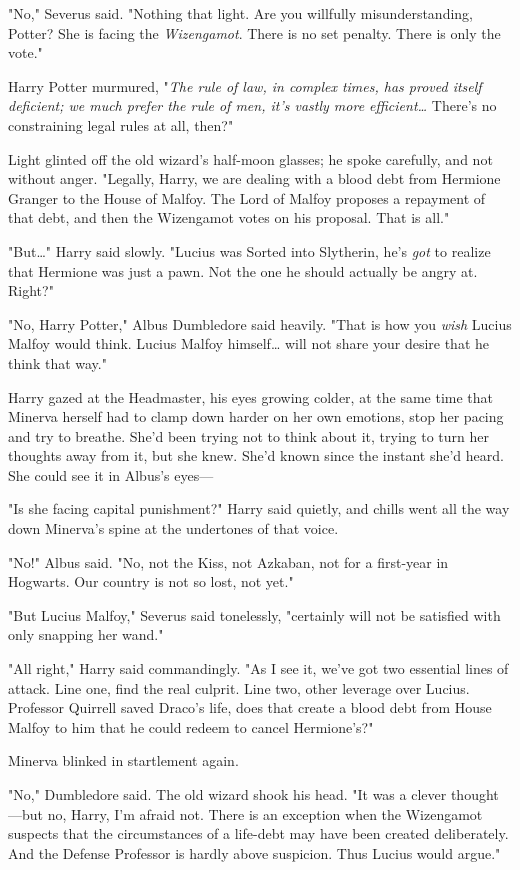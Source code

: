 "No," Severus said. "Nothing that light. Are you willfully misunderstanding, 
Potter? She is facing the \emph{Wizengamot}. There is no set penalty. There is 
only the vote."

Harry Potter murmured, "\emph{The rule of law, in complex times, has proved 
itself deficient; we much prefer the rule of men, it's vastly more 
efficient{\ldots}} There's no constraining legal rules at all, then?"

Light glinted off the old wizard's half-moon glasses; he spoke carefully, and 
not without anger. "Legally, Harry, we are dealing with a blood debt from 
Hermione Granger to the House of Malfoy. The Lord of Malfoy proposes a 
repayment of that debt, and then the Wizengamot votes on his proposal. That is 
all."

"But{\ldots}" Harry said slowly. "Lucius was Sorted into Slytherin, he's 
\emph{got} to realize that Hermione was just a pawn. Not the one he should 
actually be angry at. Right?"

"No, Harry Potter," Albus Dumbledore said heavily. "That is how you \emph{wish} 
Lucius Malfoy would think. Lucius Malfoy himself{\ldots} will not share your 
desire that he think that way."

Harry gazed at the Headmaster, his eyes growing colder, at the same time that 
Minerva herself had to clamp down harder on her own emotions, stop her pacing 
and try to breathe. She'd been trying not to think about it, trying to turn her 
thoughts away from it, but she knew. She'd known since the instant she'd heard. 
She could see it in Albus's eyes---

"Is she facing capital punishment?" Harry said quietly, and chills went all the 
way down Minerva's spine at the undertones of that voice.

"No!" Albus said. "No, not the Kiss, not Azkaban, not for a first-year in 
Hogwarts. Our country is not so lost, not yet."

"But Lucius Malfoy," Severus said tonelessly, "certainly will not be satisfied 
with only snapping her wand."

"All right," Harry said commandingly. "As I see it, we've got two essential 
lines of attack. Line one, find the real culprit. Line two, other leverage over 
Lucius. Professor Quirrell saved Draco's life, does that create a blood debt 
from House Malfoy to him that he could redeem to cancel Hermione's?"

Minerva blinked in startlement again.

"No," Dumbledore said. The old wizard shook his head. "It was a clever 
thought---but no, Harry, I'm afraid not. There is an exception when the 
Wizengamot suspects that the circumstances of a life-debt may have been created 
deliberately. And the Defense Professor is hardly above suspicion. Thus Lucius 
would argue."

